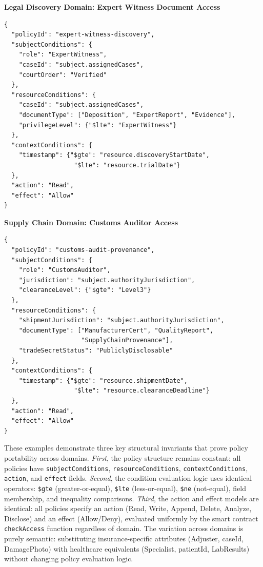 \documentclass[pdflatex,sn-mathphys-num]{sn-jnl}
\begin{document}
\textbf{Legal Discovery Domain: Expert Witness Document Access}
\begin{lstlisting}[frame=none, numbers=none]
{
  "policyId": "expert-witness-discovery",
  "subjectConditions": {
    "role": "ExpertWitness",
    "caseId": "subject.assignedCases",
    "courtOrder": "Verified"
  },
  "resourceConditions": {
    "caseId": "subject.assignedCases",
    "documentType": ["Deposition", "ExpertReport", "Evidence"],
    "privilegeLevel": {"$lte": "ExpertWitness"}
  },
  "contextConditions": {
    "timestamp": {"$gte": "resource.discoveryStartDate",
                   "$lte": "resource.trialDate"}
  },
  "action": "Read",
  "effect": "Allow"
}
\end{lstlisting}

\textbf{Supply Chain Domain: Customs Auditor Access}
\begin{lstlisting}[frame=none, numbers=none]
{
  "policyId": "customs-audit-provenance",
  "subjectConditions": {
    "role": "CustomsAuditor",
    "jurisdiction": "subject.authorityJurisdiction",
    "clearanceLevel": {"$gte": "Level3"}
  },
  "resourceConditions": {
    "shipmentJurisdiction": "subject.authorityJurisdiction",
    "documentType": ["ManufacturerCert", "QualityReport",
                     "SupplyChainProvenance"],
    "tradeSecretStatus": "PubliclyDisclosable"
  },
  "contextConditions": {
    "timestamp": {"$gte": "resource.shipmentDate",
                   "$lte": "resource.clearanceDeadline"}
  },
  "action": "Read",
  "effect": "Allow"
}
\end{lstlisting}

These examples demonstrate three key structural invariants that prove policy portability across domains. \textit{First}, the policy structure remains constant: all policies have \texttt{subjectConditions}, \texttt{resourceConditions}, \texttt{contextConditions}, \texttt{action}, and \texttt{effect} fields. \textit{Second}, the condition evaluation logic uses identical operators: \texttt{\$gte} (greater-or-equal), \texttt{\$lte} (less-or-equal), \texttt{\$ne} (not-equal), field membership, and inequality comparisons. \textit{Third}, the action and effect models are identical: all policies specify an action (Read, Write, Append, Delete, Analyze, Disclose) and an effect (Allow/Deny), evaluated uniformly by the smart contract \texttt{checkAccess} function regardless of domain. The variation across domains is purely semantic: substituting insurance-specific attributes (Adjuster, caseId, DamagePhoto) with healthcare equivalents (Specialist, patientId, LabResults) without changing policy evaluation logic.
\end{document}
